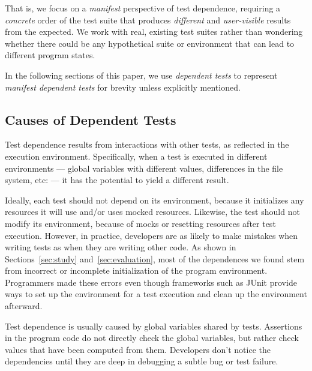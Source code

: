 That is, we focus on a \emph{manifest} perspective of test dependence,
requiring a \emph{concrete} order of the test suite that
produces \emph{different} and \emph{user-visible} results from the expected.  
%
We work with real, existing test suites rather than wondering
whether there could be any hypothetical suite 
or environment that can lead to different program states.

In the following sections of this paper, we use \textit{dependent tests}
to represent \textit{manifest dependent tests} for brevity
unless explicitly mentioned.





\subsection{Causes of Dependent Tests}


Test dependence results from interactions with other tests, as reflected
in the execution environment.
Specifically, when a
test is executed in different environments --- global variables
with different values, differences in the file system, etc: --- it has the
potential to yield
a different result.  

Ideally, each test should not depend on its environment, because it
initializes any resources it will use and/or uses mocked resources.
Likewise, the test should not modify its environment, because of mocks or
resetting resources after test execution. However, in practice,
developers are as likely
to make mistakes when writing tests as when they are writing other code.
As shown in Sections~\ref{sec:study} and~\ref{sec:evaluation}, most of the dependences we found
stem from incorrect or incomplete initialization
of the program environment.
Programmers made these errors even though frameworks such as
JUnit provide ways to set up the environment for a test execution and clean
up the environment afterward.



Test dependence is usually caused by global variables shared by tests.
Assertions in the program code
do not directly check the global variables,
but rather check values that have been computed from
them.
Developers don't notice the dependencies until they are deep in debugging a
subtle bug or test failure.


